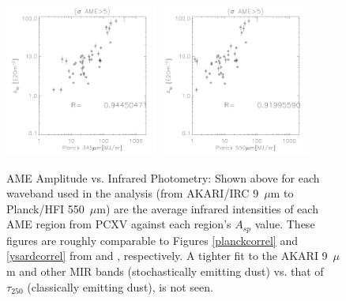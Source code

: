 \begin{figure}[!htb]
  \includegraphics[width=50mm]{IRIntMWAmp/planck857_Asp_sp.pdf}
  \includegraphics[width=50mm]{IRIntMWAmp/planck545_Asp_sp.pdf}
\caption{AME Amplitude vs. Infrared Photometry: Shown above for each waveband used in the analysis (from AKARI/IRC 9~$\mu$m to Planck/HFI 550~$\mu$m) are the average infrared intensities of each AME region from PCXV against each region's $A_{sp}$ value. These figures are roughly comparable to Figures \ref{planckcorrel} and \ref{ysardcorrel} from \cite{planckXV} and \cite{ysard10a}, respectively. A tighter fit to the AKARI 9~$\mu$m and other MIR bands (stochastically emitting dust) vs. that of $\tau_{250}$ (classically emitting dust), is not seen.
}
\label{fig:IRIntMWAmpsp}
\end{figure}
